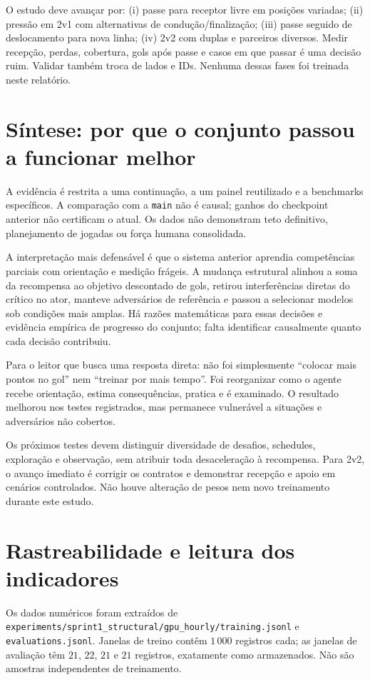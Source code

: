 \documentclass[11pt,a4paper]{article}
\newcommand{\code}[1]{\nolinkurl{#1}}
\begin{document}
O estudo deve avançar por: (i) passe para receptor livre em posições variadas; (ii) pressão em 2v1 com alternativas de condução/finalização; (iii) passe seguido de deslocamento para nova linha; (iv) 2v2 com duplas e parceiros diversos. Medir recepção, perdas, cobertura, gols após passe e casos em que passar é uma decisão ruim. Validar também troca de lados e IDs. Nenhuma dessas fases foi treinada neste relatório.

\section{Síntese: por que o conjunto passou a funcionar melhor}
A evidência é restrita a uma continuação, a um painel reutilizado e a benchmarks específicos. A comparação com a \code{main} não é causal; ganhos do checkpoint anterior não certificam o atual. Os dados não demonstram teto definitivo, planejamento de jogadas ou força humana consolidada.

A interpretação mais defensável é que o sistema anterior aprendia competências parciais com orientação e medição frágeis. A mudança estrutural alinhou a soma da recompensa ao objetivo descontado de gols, retirou interferências diretas do crítico no ator, manteve adversários de referência e passou a selecionar modelos sob condições mais amplas. Há razões matemáticas para essas decisões e evidência empírica de progresso do conjunto; falta identificar causalmente quanto cada decisão contribuiu.

Para o leitor que busca uma resposta direta: não foi simplesmente ``colocar mais pontos no gol'' nem ``treinar por mais tempo''. Foi reorganizar como o agente recebe orientação, estima consequências, pratica e é examinado. O resultado melhorou nos testes registrados, mas permanece vulnerável a situações e adversários não cobertos.

Os próximos testes devem distinguir diversidade de desafios, schedules, exploração e observação, sem atribuir toda desaceleração à recompensa. Para 2v2, o avanço imediato é corrigir os contratos e demonstrar recepção e apoio em cenários controlados. Não houve alteração de pesos nem novo treinamento durante este estudo.

\appendix
\section{Rastreabilidade e leitura dos indicadores}
Os dados numéricos foram extraídos de \code{experiments/sprint1_structural/gpu_hourly/training.jsonl} e \code{evaluations.jsonl}. Janelas de treino contêm $1\,000$ registros cada; as janelas de avaliação têm $21$, $22$, $21$ e $21$ registros, exatamente como armazenados. Não são amostras independentes de treinamento.
\end{document}
